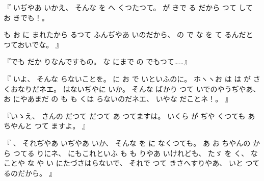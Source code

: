 %
『
いぢやあ
いかえ、
%
そんな
を
へ
くつたつて。
%
が
きで
る
だから
つて
して
お
きでも！。

%
も
お
に
まれたから
るつて
ふんぢやあ
いのだから、
%
の
で
な
を
て
るんだと
つておいでな。
』

%
『でも
だか
りなんですもの。
%
な
にまで
の
でもつて……』%

%
『
いよ、
%
そんな
らないことを。
%
に
お
で
いといふのに。
%
ホヽヽお
は
は
が
さくおなりだネエ。
%
はないぢやに
いか。
%
そんな
ばかり
つて
いでのやうぢやあ、
%
お
にやあまだ
の
も
も
くは
らないのだネエ、
%
いやな
だことネ！。
』

%
『いゝえ、
%
さんの
だつて
だつて
あ
つてますは。
%
いくら
が
ぢや
くつても
あちやんと
つて
ますよ。
』

%
『
、
%
それぢやあ
いぢやあ
いか、
%
そんな
を
に
なくつても。
%
あ
お
ちやんの
から
つてる
りにネ、
%
にもこれといふ
も
も
りやあ
いけれども、
%
たゞ
を
く、
%
なことや
な
や
い
にたづさはらないで、
%
それで
つて%
きさへすりやあ、
%
いと
つてるのだから。
』

